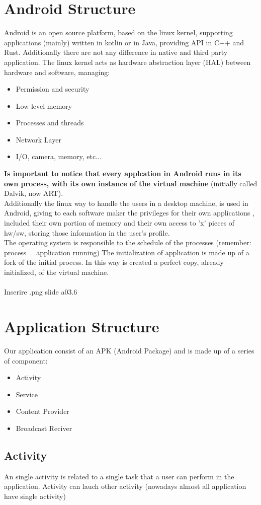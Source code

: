 \documentclass[12pt]{article}
\begin{document}
\section{Android Structure}
Android is an open source platform, based on the linux kernel, supporting applications (mainly) written in kotlin or in Java, providing API in C++ and Rust. Additionally there are not any difference in native and third party application.
The linux kernel acts as hardware abstraction layer (HAL) between hardware and software, managing:
\begin{itemize}
	\item Permission and security
	\item Low level memory
	\item Processes and threads
	\item Network Layer
	\item I/O, camera, memory, etc...
\end{itemize}
\textbf{Is important to notice that every applcation in Android runs in its own process, with its own instance of the virtual machine} (initially called Dalvik, now ART).\\
Additionally the linux way to handle the users in a desktop machine, is used in Android, giving to each software maker the privileges for their own applications , included their own portion of memory and their own access to 'x' pieces of hw/sw, storing those information in the user's profile.\\
The operating system is responsible to the schedule of the processes (remember: process = application running)
The initialization of application is made up of a fork of the initial process. In this way is created a perfect copy, already initialized, of the virtual machine.\\
\\Inserire .png slide a03.6
\newpage


\section{Application Structure}
Our application consist of an APK (Android Package) and is made up of a series of component: 
\begin{itemize}
	\item	Activity
	\item	Service
	\item	Content Provider
	\item 	Broadcast Reciver
\end{itemize}
\subsection{Activity}
An single activity is related to a single task that a user can perform in the application. Activity can lauch other activity (nowadays almost all application have single activity)
\end{document}

